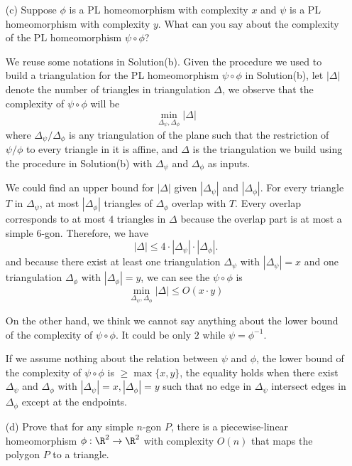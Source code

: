 \documentclass[11pt]{article}
\begin{document}
\begin{enumerate}[(a)]
\begin{solution}
\end{solution}

  \item[(c)]
    Suppose \(\phi\) is a PL homeomorphism with complexity \(x\) and \(\psi\) is a PL
    homeomorphism with complexity \(y\).
    What can you say about the complexity of the PL homeomorphism \(\psi \circ \phi\)?

\begin{solution}
  We reuse some notations in Solution(b).
  Given the procedure we used to build a triangulation for the PL homeomorphism \(\psi\circ \phi\) in Solution(b), let \(|\Delta|\) denote the number of triangles in triangulation \(\Delta\), we observe that the complexity of \(\psi\circ \phi\) will be 
  \[\min_{\Delta_{\psi},\Delta_{\phi}}|\Delta|\]
  where \(\Delta_{\psi}/\Delta_{\phi}\) is any triangulation of the plane such that the restriction of \(\psi/\phi\) to every triangle in it is affine, and \(\Delta\) is the triangulation we build using the procedure in Solution(b) with \(\Delta_{\psi}\) and \(\Delta_{\phi}\) as inputs.

  We could find an upper bound for \(|\Delta|\) given \(|\Delta_{\psi}|\) and \(|\Delta_{\phi}|\).
  For every triangle \(T\) in \(\Delta_{\psi}\), at most \(|\Delta_{\phi}|\) triangles of \(\Delta_{\phi}\) overlap with \(T\). Every overlap corresponds to at most \(4\) triangles in \(\Delta\) because the overlap part is at most a simple \(6\)-gon. Therefore, we have
  \[|\Delta|\le 4\cdot|\Delta_{\psi}|\cdot|\Delta_{\phi}|.\]
  and because there exist at least one triangulation \(\Delta_{\psi}\) with \(|\Delta_{\psi}|=x\) and one triangulation \(\Delta_{\phi}\) with \(|\Delta_{\phi}|=y\), we can see the  \(\psi\circ\phi\) is 
  \[\min_{\Delta_{\psi},\Delta_{\phi}}|\Delta|\le O(x\cdot y)\]

  On the other hand, we think we cannot say anything about the lower bound of the complexity of \(\psi\circ\phi\). It could be only \(2\) while \(\psi=\phi^{-1}\).

  If we assume nothing about the relation between \(\psi\) and \(\phi\), the lower bound of the complexity of \(\psi\circ \phi\) is \(\ge\max\{x,y\}\), the equality holds when there exist \(\Delta_{\psi}\) and \(\Delta_{\phi}\) with \(|\Delta_{\psi}|=x,|\Delta_{\phi}|=y\) such that no edge in \(\Delta_{\psi}\) intersect edges in \(\Delta_{\phi}\) except at the endpoints.
\end{solution}

  \item[(d)]
    Prove that for any simple \(n\)-gon \(P\), there is a piecewise-linear homeomorphism \(\phi :
    \R^2 \to \R^2\) with complexity \(O(n)\) that maps the polygon \(P\) to a triangle.


\end{enumerate}
\end{document}

